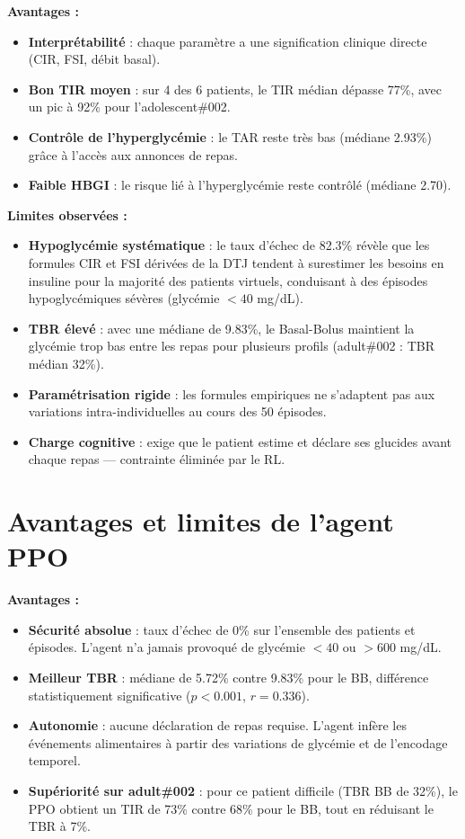 \documentclass[a4paper,12pt]{report}
\begin{document}
\textbf{Avantages :}
\begin{itemize}
  \item \textbf{Interprétabilité} : chaque paramètre a une signification clinique directe (CIR, FSI, débit basal).
  \item \textbf{Bon TIR moyen} : sur 4 des 6 patients, le TIR médian dépasse 77\%, avec un pic à 92\% pour l'adolescent\#002.
  \item \textbf{Contrôle de l'hyperglycémie} : le TAR reste très bas (médiane 2.93\%) grâce à l'accès aux annonces de repas.
  \item \textbf{Faible HBGI} : le risque lié à l'hyperglycémie reste contrôlé (médiane 2.70).
\end{itemize}

\textbf{Limites observées :}
\begin{itemize}
  \item \textbf{Hypoglycémie systématique} : le taux d'échec de 82.3\% révèle que les formules CIR et FSI dérivées de la DTJ tendent à surestimer les besoins en insuline pour la majorité des patients virtuels, conduisant à des épisodes hypoglycémiques sévères (glycémie $< 40$ mg/dL).
  \item \textbf{TBR élevé} : avec une médiane de 9.83\%, le Basal-Bolus maintient la glycémie trop bas entre les repas pour plusieurs profils (adult\#002 : TBR médian 32\%).
  \item \textbf{Paramétrisation rigide} : les formules empiriques ne s'adaptent pas aux variations intra-individuelles au cours des 50 épisodes.
  \item \textbf{Charge cognitive} : exige que le patient estime et déclare ses glucides avant chaque repas --- contrainte éliminée par le RL.
\end{itemize}

\section{Avantages et limites de l'agent PPO}

\textbf{Avantages :}
\begin{itemize}
  \item \textbf{Sécurité absolue} : taux d'échec de 0\% sur l'ensemble des patients et épisodes. L'agent n'a jamais provoqué de glycémie $< 40$ ou $> 600$ mg/dL.
  \item \textbf{Meilleur TBR} : médiane de 5.72\% contre 9.83\% pour le BB, différence statistiquement significative ($p < 0.001$, $r = 0.336$).
  \item \textbf{Autonomie} : aucune déclaration de repas requise. L'agent infère les événements alimentaires à partir des variations de glycémie et de l'encodage temporel.
  \item \textbf{Supériorité sur adult\#002} : pour ce patient difficile (TBR BB de 32\%), le PPO obtient un TIR de 73\% contre 68\% pour le BB, tout en réduisant le TBR à 7\%.
\end{itemize}
\end{document}
